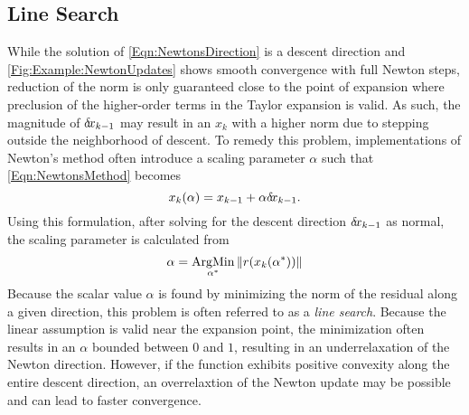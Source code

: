 \documentclass[12pt]{UWMadThesis}
\begin{document}
\subsection{Line Search}
While the solution of \cref{Eqn:NewtonsDirection} is a descent direction and \cref{Fig:Example:NewtonUpdates} shows smooth convergence with full Newton steps, reduction of the norm is only guaranteed close to the point of expansion where preclusion of the higher-order terms in the Taylor expansion is valid.
As such, the magnitude of $\delta \mkern-3.00mu x_{k-1}$ may result in an $x_k$ with a higher norm due to stepping outside the neighborhood of descent.
To remedy this problem, implementations of Newton's method often introduce a scaling parameter $\alpha$ such that \cref{Eqn:NewtonsMethod} becomes
\begin{equation}
    x_k(\alpha) = x_{k-1} + \alpha \delta \mkern-3.00mu x_{k-1}.
\end{equation}
Using this formulation, after solving for the descent direction $\delta \mkern-3.00mu x_{k-1}$ as normal, the scaling parameter is calculated from
\begin{equation}
    \alpha = \operatorname*{ArgMin}_{\alpha^*}\|r(x_{k}(\alpha^*))\|
    \label{Eqn:ExactLineSearch}
\end{equation}
Because the scalar value $\alpha$ is found by minimizing the norm of the residual along a given direction, this problem is often referred to as a \textit{line search}.
Because the linear assumption is valid near the expansion point, the minimization often results in an $\alpha$ bounded between $0$ and $1$, resulting in an underrelaxation of the Newton direction.
However, if the function exhibits positive convexity along the entire descent direction, an overrelaxtion of the Newton update may be possible and can lead to faster convergence.
\end{document}
